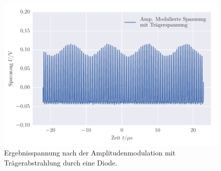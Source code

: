 
\FloatBarrier\begin{figure}[!h]
\centering
\includegraphics[scale=1]{../Grafiken/Amplituden_Modulierte_Spannung_mit_Traeger.pdf}
\caption{Ergebnisspannung nach der Amplitudenmodulation mit Trägerabstrahlung durch 
	eine Diode.\label{fig:amplituden_modulierte_spannung_mit_traeger}}
\end{figure}
\FloatBarrier